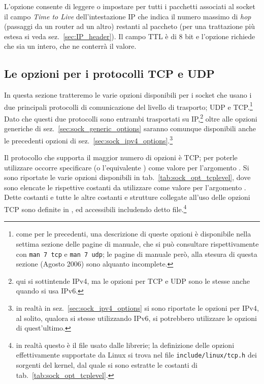 \begin{basedescript}{\desclabelwidth{2.0cm}\desclabelstyle{\nextlinelabel}}
\item[\constd{IP\_TTL}] L'opzione consente di leggere o impostare per tutti i
  pacchetti associati al socket il campo \textit{Time to Live}
  dell'intestazione IP che indica il numero massimo di \textit{hop} (passaggi
  da un router ad un altro) restanti al paccheto (per una trattazione più
  estesa si veda sez.~\ref{sec:IP_header}).  Il campo TTL è di 8 bit e
  l'opzione richiede che  sia un intero, che ne conterrà il
  valore.
\end{basedescript}



\subsection{Le opzioni per i protocolli TCP e UDP}
\label{sec:sock_tcp_udp_options}

In questa sezione tratteremo le varie opzioni disponibili per i socket che
usano i due principali protocolli di comunicazione del livello di trasporto;
UDP e TCP.\footnote{come per le precedenti, una descrizione di queste opzioni
  è disponibile nella settima sezione delle pagine di manuale, che si può
  consultare rispettivamente con \texttt{man 7 tcp} e \texttt{man 7 udp}; le
  pagine di manuale però, alla stesura di questa sezione (Agosto 2006) sono
  alquanto incomplete.}  Dato che questi due protocolli sono entrambi
trasportati su IP,\footnote{qui si sottintende IPv4, ma le opzioni per TCP e
  UDP sono le stesse anche quando si usa IPv6.} oltre alle opzioni generiche
di sez.~\ref{sec:sock_generic_options} saranno comunque disponibili anche le
precedenti opzioni di sez.~\ref{sec:sock_ipv4_options}.\footnote{in realtà in
  sez.~\ref{sec:sock_ipv4_options} si sono riportate le opzioni per IPv4, al
  solito, qualora si stesse utilizzando IPv6, si potrebbero utilizzare le
  opzioni di quest'ultimo.}

Il protocollo che supporta il maggior numero di opzioni è TCP; per poterle
utilizzare occorre specificare  (o l'equivalente
) come valore per l'argomento . Si sono
riportate le varie opzioni disponibili in tab.~\ref{tab:sock_opt_tcplevel},
dove sono elencate le rispettive costanti da utilizzare come valore per
l'argomento . Dette costanti e tutte le altre costanti e
strutture collegate all'uso delle opzioni TCP sono definite in
, ed accessibili includendo detto file.\footnote{in
  realtà questo è il file usato dalle librerie; la definizione delle opzioni
  effettivamente supportate da Linux si trova nel file
  \texttt{include/linux/tcp.h} dei sorgenti del kernel, dal quale si sono
  estratte le costanti di tab.~\ref{tab:sock_opt_tcplevel}.}

